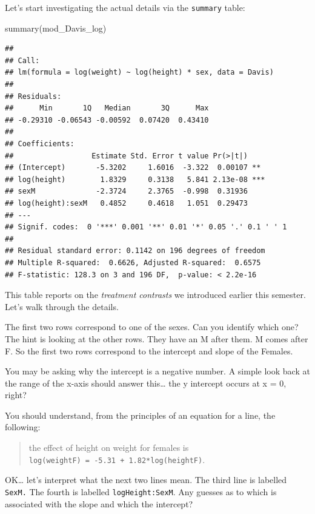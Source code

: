\documentclass[
]{book}
\newenvironment{Shaded}{\begin{snugshade}}{\end{snugshade}}
\newcommand{\FunctionTok}[1]{\textcolor[rgb]{0.00,0.00,0.00}{#1}}
\newcommand{\NormalTok}[1]{#1}
\begin{document}
Let's start investigating the actual details via the \texttt{summary} table:

\begin{Shaded}
\begin{Highlighting}[]
\FunctionTok{summary}\NormalTok{(mod\_Davis\_log)}
\end{Highlighting}
\end{Shaded}

\begin{verbatim}
## 
## Call:
## lm(formula = log(weight) ~ log(height) * sex, data = Davis)
## 
## Residuals:
##      Min       1Q   Median       3Q      Max 
## -0.29310 -0.06543 -0.00592  0.07420  0.43410 
## 
## Coefficients:
##                  Estimate Std. Error t value Pr(>|t|)    
## (Intercept)       -5.3202     1.6016  -3.322  0.00107 ** 
## log(height)        1.8329     0.3138   5.841 2.13e-08 ***
## sexM              -2.3724     2.3765  -0.998  0.31936    
## log(height):sexM   0.4852     0.4618   1.051  0.29473    
## ---
## Signif. codes:  0 '***' 0.001 '**' 0.01 '*' 0.05 '.' 0.1 ' ' 1
## 
## Residual standard error: 0.1142 on 196 degrees of freedom
## Multiple R-squared:  0.6626, Adjusted R-squared:  0.6575 
## F-statistic: 128.3 on 3 and 196 DF,  p-value: < 2.2e-16
\end{verbatim}

This table reports on the \emph{treatment contrasts} we introduced earlier this semester. Let's walk through the details.

The first two rows correspond to one of the sexes. Can you identify which one? The hint is looking at the other rows. They have an M after them. M comes after F. So the first two rows correspond to the intercept and slope of the Females.

You may be asking why the intercept is a negative number. A simple look back at the range of the x-axis should answer this\ldots{} the y intercept occurs at x = 0, right?

You should understand, from the principles of an equation for a line, the following:

\begin{quote}
the effect of height on weight for females is \texttt{log(weightF)\ =\ -5.31\ +\ 1.82*log(heightF)}.
\end{quote}

OK\ldots{} let's interpret what the next two lines mean. The third line is labelled \texttt{SexM.} The fourth is labelled \texttt{logHeight:SexM}. Any guesses as to which is associated with the slope and which the intercept?
\end{document}
